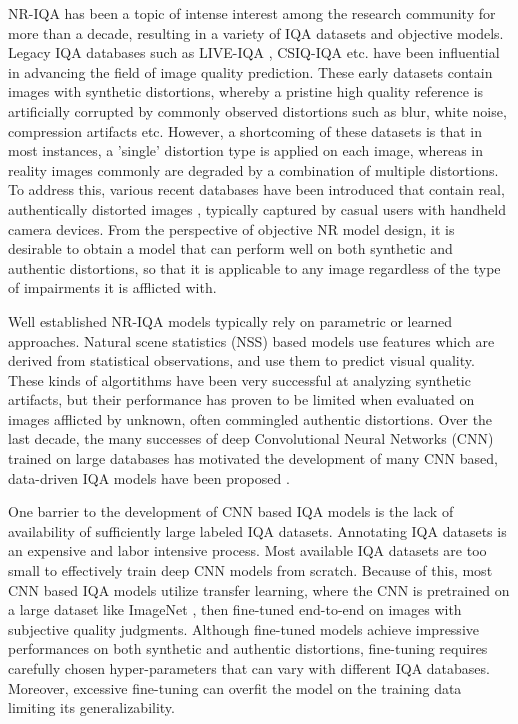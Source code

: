 \documentclass[journal]{IEEEtran}
\begin{document}
NR-IQA has been a topic of intense interest among the research community for more than a decade, resulting in a variety of IQA datasets and objective models. Legacy IQA databases such as LIVE-IQA \cite{sheikh2006statistical}, CSIQ-IQA \cite{larson2010most} etc. have been influential in advancing the field of image quality prediction. These early datasets contain images with synthetic distortions, whereby a pristine high quality reference is artificially corrupted by commonly observed distortions such as blur, white noise, compression artifacts etc. However, a shortcoming of these datasets is that in most instances, a 'single' distortion type is applied on each image, whereas in reality images commonly are degraded by a combination of multiple distortions. To address this, various recent databases have been introduced that contain real, authentically distorted images \cite{ghadiyaram2015massive,hosu2020koniq,ying2019patches,fang2020perceptual}, typically captured by casual users with handheld camera devices. From the perspective of objective NR model design, it is desirable to obtain a model that can perform well on both synthetic and authentic distortions, so that it is applicable to any image regardless of the type of impairments it is afflicted with.

Well established NR-IQA models typically rely on parametric or learned approaches. Natural scene statistics (NSS) based models \cite{moorthy2011blind,saad2012blind,mittal2012no,mittal2013making} use features which are derived from statistical observations, and use them to predict visual quality. These kinds of algortithms have been very successful at analyzing synthetic artifacts, but their performance has proven to be limited when evaluated on images afflicted by unknown, often commingled authentic distortions. Over the last decade, the many successes of deep Convolutional Neural Networks (CNN) \cite{he2016deep,he2017mask,sun2018pwc} trained on large databases has motivated the development of many CNN based, data-driven IQA models have been proposed \cite{zhang2018blind,kim2016fully,zeng2017probabilistic,su2020blindly}. 

One barrier to the development of CNN based IQA models is the lack of availability of sufficiently large labeled IQA datasets. Annotating IQA datasets is an expensive and labor intensive process. Most available IQA datasets are too small to effectively train deep CNN models from scratch. Because of this, most CNN based IQA models utilize transfer learning, where the CNN is pretrained on a large dataset like ImageNet \cite{russakovsky2015imagenet}, then fine-tuned end-to-end on images with subjective quality judgments. Although fine-tuned models achieve impressive performances on both synthetic and authentic distortions, fine-tuning requires carefully chosen hyper-parameters that can vary with different IQA databases. Moreover, excessive fine-tuning can overfit the model on the training data limiting its generalizability.
\end{document}
